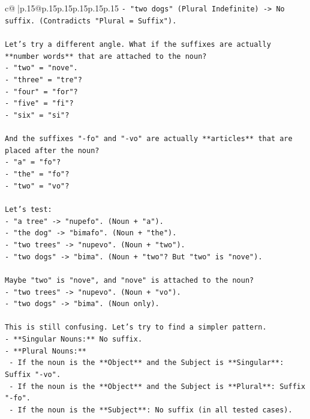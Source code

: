 \documentclass{article}
\begin{document}
{\begin{supertabular}{c@{$\;$}|p{.15\linewidth}@{}p{.15\linewidth}p{.15\linewidth}p{.15\linewidth}p{.15\linewidth}p{.15\linewidth}}
{{{\texttt{{-} "two dogs" (Plural Indefinite) {-}> No suffix. (Contradicts "Plural = Suffix").} \\
\\ 
\texttt{Let's try a different angle. What if the suffixes are actually **number words** that are attached to the noun?} \\
\texttt{{-} "two" = "nove".} \\
\texttt{{-} "three" = "tre"?} \\
\texttt{{-} "four" = "for"?} \\
\texttt{{-} "five" = "fi"?} \\
\texttt{{-} "six" = "si"?} \\
\\ 
\texttt{And the suffixes "{-}fo" and "{-}vo" are actually **articles** that are placed after the noun?} \\
\texttt{{-} "a" = "fo"?} \\
\texttt{{-} "the" = "fo"?} \\
\texttt{{-} "two" = "vo"?} \\
\\ 
\texttt{Let's test:} \\
\texttt{{-} "a tree" {-}> "nupefo". (Noun + "a").} \\
\texttt{{-} "the dog" {-}> "bimafo". (Noun + "the").} \\
\texttt{{-} "two trees" {-}> "nupevo". (Noun + "two").} \\
\texttt{{-} "two dogs" {-}> "bima". (Noun + "two"? But "two" is "nove").} \\
\\ 
\texttt{Maybe "two" is "nove", and "nove" is attached to the noun?} \\
\texttt{{-} "two trees" {-}> "nupevo". (Noun + "vo").} \\
\texttt{{-} "two dogs" {-}> "bima". (Noun only).} \\
\\ 
\texttt{This is still confusing. Let's try to find a simpler pattern.} \\
\texttt{{-} **Singular Nouns:** No suffix.} \\
\texttt{{-} **Plural Nouns:**} \\
\texttt{  {-} If the noun is the **Object** and the Subject is **Singular**: Suffix "{-}vo".} \\
\texttt{  {-} If the noun is the **Object** and the Subject is **Plural**: Suffix "{-}fo".} \\
\texttt{  {-} If the noun is the **Subject**: No suffix (in all tested cases).} \\
}}}
\end{supertabular}}
\end{document}
